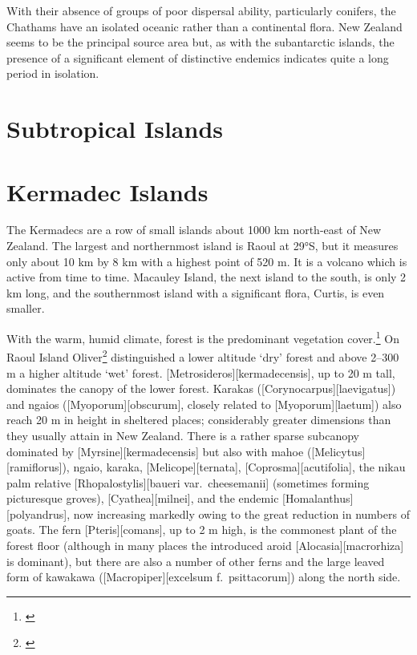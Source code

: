 With their absence of groups of poor dispersal ability, particularly conifers, the Chathams have an isolated oceanic rather than a continental flora.
New Zealand seems to be the principal source area but, as with the subantarctic islands, the presence of a significant element of distinctive endemics indicates quite a long period in isolation.

\section{Subtropical Islands}

\section{Kermadec Islands}

The Kermadecs are a row of small islands about 1000 km north-east of New Zealand.
The largest and northernmost island is Raoul at 29°S, but it measures only about 10 km by 8 km with a highest point of 520 m.
It is a volcano which is active from time to time.
Macauley Island, the next island to the south, is only 2 km long, and the southernmost island with a significant flora, Curtis, is even smaller.

With the warm, humid climate, forest is the predominant vegetation cover.\footnote{\cite{sykes1977annotated}}
On Raoul Island Oliver\footnote{\cite{oliver1910vegetation}} distinguished a lower altitude `dry' forest and above 2–300 m a higher altitude `wet' forest. [Metrosideros][kermadecensis], up to 20 m tall, dominates the canopy of the lower forest.
Karakas ([Corynocarpus][laevigatus]) and ngaios ([Myoporum][obscurum], closely related to [Myoporum][laetum]) also reach 20 m in height in sheltered places; considerably greater dimensions than they usually attain in New Zealand.
There is a rather sparse subcanopy dominated by [Myrsine][kermadecensis] but also with mahoe ([Melicytus][ramiflorus]), ngaio, karaka, [Melicope][ternata], [Coprosma][acutifolia], the nikau palm relative [Rhopalostylis][baueri var.\ cheesemanii] (sometimes forming picturesque groves), [Cyathea][milnei], and the endemic [Homalanthus][polyandrus], now increasing markedly owing to the great reduction in numbers of goats.
The fern [Pteris][comans], up to 2 m high, is the commonest plant of the forest floor (although in many places the introduced aroid [Alocasia][macrorhiza] is dominant), but there are also a number of other ferns and the large leaved form of kawakawa ([Macropiper][excelsum f.\ psittacorum]) along the north side.

